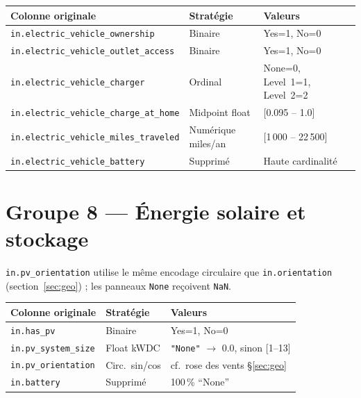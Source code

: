 \documentclass[11pt,a4paper]{article}
\begin{document}
\begin{center}
\begin{tabular}{L{5.2cm}L{3.5cm}L{5.3cm}}
\toprule
\textbf{Colonne originale} & \textbf{Stratégie} & \textbf{Valeurs} \\
\midrule
{}
\texttt{in.electric\_vehicle\_ownership} & Binaire & Yes=1, No=0 \\
\texttt{in.electric\_vehicle\_outlet\_access} & Binaire & Yes=1, No=0 \\
\texttt{in.electric\_vehicle\_charger} & Ordinal & None=0, Level~1=1, Level~2=2 \\
\texttt{in.electric\_vehicle\_charge\_at\_home} & Midpoint float & [0.095 – 1.0] \\
\texttt{in.electric\_vehicle\_miles\_traveled} & Numérique miles/an & [1\,000 – 22\,500] \\
\texttt{in.electric\_vehicle\_battery} & Supprimé & Haute cardinalité \\
\bottomrule
\end{tabular}
\end{center}

\section{Groupe 8 — Énergie solaire et stockage}

\texttt{in.pv\_orientation} utilise le même encodage circulaire que
\texttt{in.orientation} (section~\ref{sec:geo}) ; les panneaux \texttt{None}
reçoivent \texttt{NaN}.

\begin{center}
\begin{tabular}{L{5.2cm}L{3.5cm}L{5.3cm}}
\toprule
\textbf{Colonne originale} & \textbf{Stratégie} & \textbf{Valeurs} \\
\midrule
{}
\texttt{in.has\_pv} & Binaire & Yes=1, No=0 \\
\texttt{in.pv\_system\_size} & Float kWDC & \texttt{"None"} $\to$ 0.0, sinon [1–13] \\
\texttt{in.pv\_orientation} & Circ.\ sin/cos & cf.\ rose des vents §\ref{sec:geo} \\
\texttt{in.battery} & Supprimé & 100\,\% ``None'' \\
\bottomrule
\end{tabular}
\end{center}
\end{document}
